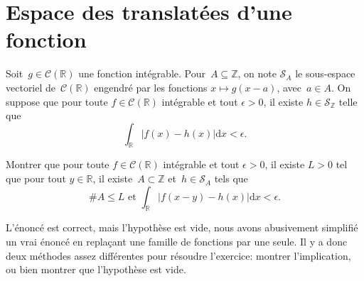 \section{Espace des translatées d'une fonction}
\label{sec:espace-des-transl}


Soit~$g \in \mathcal{C}(\mathbb{R})$ une fonction intégrable.
Pour~$A\subseteq \mathbb{Z}$, on note $\mathcal{S}_A$ le sous-espace vectoriel de~$\mathcal{C}(\mathbb{R})$ engendré par les fonctions $x\mapsto g(x-a)$, avec~$a\in A$.
On suppose que pour toute $f \in \mathcal{C}(\mathbb{R})$ intégrable et tout $\epsilon > 0$, il existe $h \in \mathcal{S}_\mathbb{Z}$ telle que
\[ \int_\mathbb{R} |f(x)-h(x)| \mathrm{d}x<\epsilon. \]

Montrer que pour toute $f\in \mathcal{C}(\mathbb{R})$ intégrable et tout $\epsilon >0$, il existe $L>0$ tel que
pour tout $y \in \mathbb{R}$, il existe~$A \subset \mathbb{Z}$ et~$h\in \mathcal{S}_A$ tels que
\[ \# A \leq L \text{ et } \int_\mathbb{R} |f(x-y)-h(x)|\mathrm{d} x< \epsilon. \]

\begin{em}
  L'énoncé est correct, mais l'hypothèse est vide, nous avons abusivement simplifié un vrai énoncé en replaçant une famille de fonctions par une seule. Il y a donc deux méthodes assez différentes pour résoudre l'exercice: montrer l'implication, ou bien montrer que l'hypothèse est vide.
\end{em}

